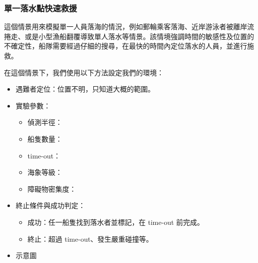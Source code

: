 \documentclass[12pt,a4paper]{article}
\begin{document}
\subsubsection{單一落水點快速救援}
這個情景用來模擬單一人員落海的情況，例如郵輪乘客落海、近岸游泳者被離岸流捲走、或是小型漁船翻覆導致單人落水等情景。該情境強調時間的敏感性及位置的不確定性，船隊需要經過仔細的搜尋，在最快的時間內定位落水的人員，並進行施救。
\\ \par
在這個情景下，我們使用以下方法設定我們的環境：
\begin{itemize}
    \item 遇難者定位：位置不明，只知道大概的範圍。
    \item 實驗參數：
    \begin{itemize}
        \item 偵測半徑：
        \item 船隻數量：
        \item time-out：
        \item 海象等級：
        \item 障礙物密集度：
    \end{itemize}
    \item 終止條件與成功判定：
    \begin{itemize}
        \item 成功：任一船隻找到落水者並標記，在 time-out 前完成。
        \item 終止：超過 time-out、發生嚴重碰撞等。
    \end{itemize}
    \item 示意圖
\end{itemize}
\end{document}
